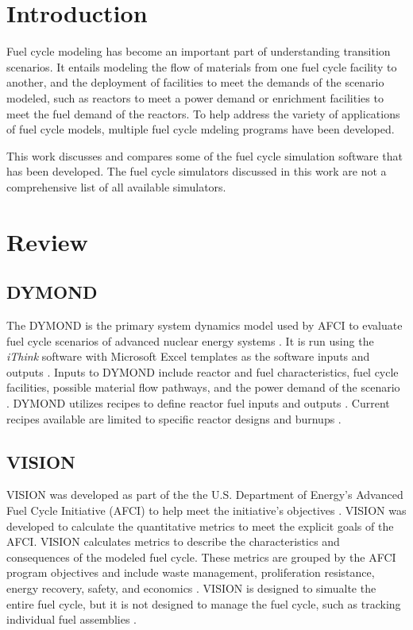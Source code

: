 \documentclass{article}
\begin{document}
    \section{Introduction}
    Fuel cycle modeling has become an important part of understanding 
    transition scenarios. It entails modeling the flow of materials 
    from one fuel cycle facility to another, and the deployment of 
    facilities to meet the demands of the scenario modeled, such as
    reactors to meet a power demand or enrichment facilities to meet 
    the fuel demand of the reactors. To help address the 
    variety of applications 
    of fuel cycle models, multiple fuel cycle mdeling programs have 
    been developed. 

    This work discusses and compares some of the fuel cycle simulation 
    software that has been developed. The fuel cycle simulators 
    discussed in this work are not a comprehensive list of all available 
    simulators. 
    

    \section{Review}
    
    
    \subsection{DYMOND}
    The \gls{DYMOND} is the primary 
    system dynamics model used by AFCI to evaluate fuel cycle scenarios of 
    advanced nuclear energy systems \cite{yacout_visionverifiable_2006}.
    It is run using the \textit{iThink} software with Microsoft Excel 
    templates as the software inputs and outputs \cite{feng_standardized_2016}.
    Inputs to DYMOND include reactor and fuel characteristics, fuel cycle
    facilities, possible material flow pathways, and the power demand of the 
    scenario \cite{feng_standardized_2016}. 
    \gls{DYMOND} utilizes recipes to define reactor fuel inputs and outputs 
    \cite{yacout_visionverifiable_2006}. Current recipes available are limited 
    to specific reactor designs and burnups \cite{yacout_visionverifiable_2006}.

    \subsection{VISION}
    \Ac{VISION} was developed as part 
    of the the U.S. Department of Energy's Advanced Fuel Cycle Initiative 
    (AFCI) to help meet the initiative's objectives 
    \cite{yacout_visionverifiable_2006}. VISION was developed to 
    calculate the quantitative metrics to meet the explicit goals of the 
    AFCI. VISION calculates metrics to describe the characteristics and 
    consequences of the modeled fuel cycle. These metrics are grouped by the 
    AFCI program objectives and include waste management, proliferation 
    resistance, energy recovery, safety, and economics 
    \cite{yacout_visionverifiable_2006}. VISION is designed to simualte the 
    entire fuel cycle, but it is not designed to manage the fuel cycle, such 
    as tracking individual fuel assemblies \cite{yacout_visionverifiable_2006}.
\end{document}
